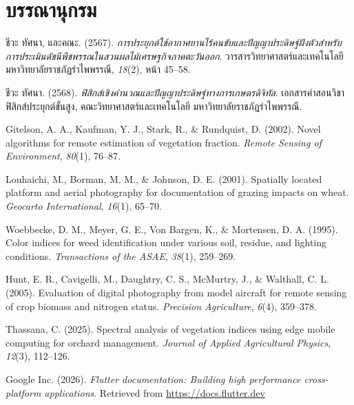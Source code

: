 \chapter*{บรรณานุกรม}

\begin{enumerate}[label={[\arabic*]}, leftmargin=2em, itemsep=6pt]
    \item ชีวะ ทัศนา, และคณะ. (2567). \textit{การประยุกต์ใช้อากาศยานไร้คนขับและปัญญาประดิษฐ์ฝังตัวสำหรับการประเมินดัชนีพืชพรรณในสวนผลไม้เศรษฐกิจภาคตะวันออก}. วารสารวิทยาศาสตร์และเทคโนโลยี มหาวิทยาลัยราชภัฏรำไพพรรณี, \textit{18}(2), หน้า 45--58.
    \item ชีวะ ทัศนา. (2568). \textit{ฟิสิกส์เชิงคำนวณและปัญญาประดิษฐ์ทางการเกษตรดิจิทัล}. เอกสารคำสอนวิชาฟิสิกส์ประยุกต์ขั้นสูง, คณะวิทยาศาสตร์และเทคโนโลยี มหาวิทยาลัยราชภัฏรำไพพรรณี.
    \item Gitelson, A. A., Kaufman, Y. J., Stark, R., \& Rundquist, D. (2002). Novel algorithms for remote estimation of vegetation fraction. \textit{Remote Sensing of Environment}, \textit{80}(1), 76--87.
    \item Louhaichi, M., Borman, M. M., \& Johnson, D. E. (2001). Spatially located platform and aerial photography for documentation of grazing impacts on wheat. \textit{Geocarto International}, \textit{16}(1), 65--70.
    \item Woebbecke, D. M., Meyer, G. E., Von Bargen, K., \& Mortensen, D. A. (1995). Color indices for weed identification under various soil, residue, and lighting conditions. \textit{Transactions of the ASAE}, \textit{38}(1), 259--269.
    \item Hunt, E. R., Cavigelli, M., Daughtry, C. S., McMurtry, J., \& Walthall, C. L. (2005). Evaluation of digital photography from model aircraft for remote sensing of crop biomass and nitrogen status. \textit{Precision Agriculture}, \textit{6}(4), 359--378.
    \item Thassana, C. (2025). Spectral analysis of vegetation indices using edge mobile computing for orchard management. \textit{Journal of Applied Agricultural Physics}, \textit{12}(3), 112--126.
    \item Google Inc. (2026). \textit{Flutter documentation: Building high performance cross-platform applications}. Retrieved from \url{https://docs.flutter.dev}
\end{enumerate}

\clearpage
